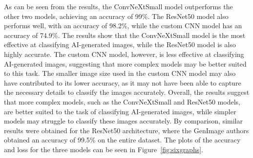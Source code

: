 \documentclass[runningheads]{llncs}
\begin{document}
As can be seen from the results, the ConvNeXtSmall model outperforms the other two models, achieving an accuracy of 99\%. The ResNet50 model also performs well, with an accuracy of 98.2\%, while the custom CNN model has an accuracy of 74.9\%. The results show that the ConvNeXtSmall model is the most effective at classifying AI-generated images, while the ResNet50 model is also highly accurate. The custom CNN model, however, is less effective at classifying AI-generated images, suggesting that more complex models may be better suited to this task. The smaller image size used in the custom CNN model may also have contributed to its lower accuracy, as it may not have been able to capture the necessary details to classify the images accurately. Overall, the results suggest that more complex models, such as the ConvNeXtSmall and ResNet50 models, are better suited to the task of classifying AI-generated images, while simpler models may struggle to classify these images accurately. By comparison, similar results were obtained for the ResNet50 architecture, where the GenImage authors obtained an accuracy of 99.5\%  on the entire dataset. The plots of the accuracy and loss for the three models can be seen in Figure~\ref{fig:sixgraphs}.
\end{document}
